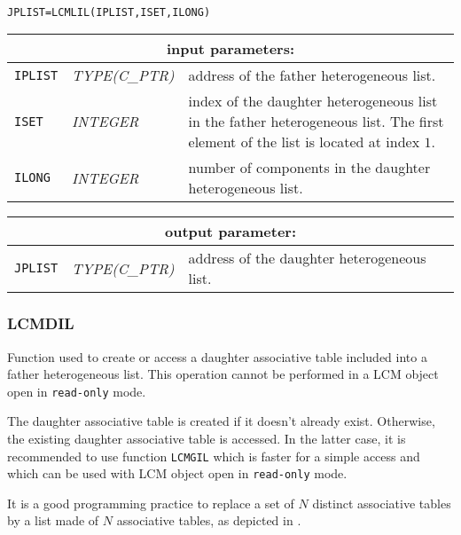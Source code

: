 \begin{verbatim}

JPLIST=LCMLIL(IPLIST,ISET,ILONG)
\end{verbatim}

\noindent
\begin{tabular}{|p{1.5cm}|p{3cm}|p{10cm}|}
\hline
\multicolumn{3}{|c|}{\bf input parameters:} \\
\hline
{\tt IPLIST} & {\it TYPE(C\_PTR)} & address of the father heterogeneous list. \\
\hline
{\tt ISET} & {\it INTEGER} & index of the daughter heterogeneous list in the father heterogeneous list.
The first element of the list is located at index $1$. \\
\hline
{\tt ILONG} & {\it INTEGER} & number of components in the daughter heterogeneous list. \\
\hline
\end{tabular}

\vskip 0.8cm

\noindent
\begin{tabular}{|p{1.5cm}|p{3cm}|p{10cm}|}
\hline
\multicolumn{3}{|c|}{\bf output parameter:} \\
\hline
{\tt JPLIST} & {\it TYPE(C\_PTR)} & address of the daughter heterogeneous list. \\
\hline
\end{tabular}

\subsubsection{LCMDIL}

Function used to create or access a daughter associative table included into a father heterogeneous list. This operation cannot be
performed in a LCM object open in {\tt read-only} mode.

\vskip 0.2cm

The daughter associative table is created if it doesn't already exist. Otherwise, the
existing daughter associative table is accessed. In the latter case, it is recommended
to use function {\tt LCMGIL} which is faster for a simple access and which can be used
with LCM object open in {\tt read-only} mode.

\vskip 0.2cm

It is a good programming practice to replace a set of $N$ distinct associative tables by a
list made of $N$ associative tables, as depicted in .

\vskip 0.2cm

